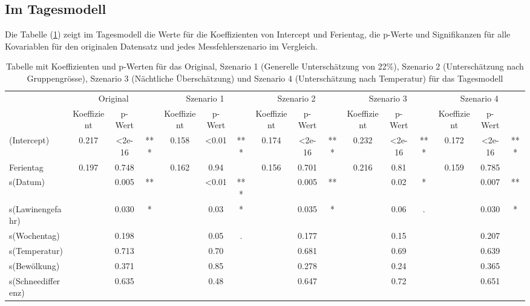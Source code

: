 \documentclass[12pt]{scrreprt}
\begin{document}
\subsection{Im Tagesmodell}
Die Tabelle (\ref{tab:Szenarien im Tagesmodell}) zeigt im Tagesmodell die Werte für die Koeffizienten von Intercept und Ferientag, die p-Werte und Signifikanzen für alle Kovariablen für den originalen Datensatz und jedes Messfehlerszenario im Vergleich. \\
\begin{table}[h]
	\centering
	\begin{adjustbox}{max width=\textwidth}
	\begin{tabular}{l|ccc|ccc|ccc|ccc|ccc|}
		\multicolumn{1}{r}{} & 
		\multicolumn{3}{c}{Original} & 
		\multicolumn{3}{c}{Szenario 1} & 
		\multicolumn{3}{c}{Szenario 2} & 
		\multicolumn{3}{c}{Szenario 3} & 
		\multicolumn{3}{c}{Szenario 4} \\
		& Koeffizient & p-Wert &       & Koeffizient & p-Wert &       & Koeffizient & p-Wert &       & Koeffizient & p-Wert &       & Koeffizient & p-Wert &  \\
		\cmidrule{2-16}    (Intercept) & 0.217 & <2e-16 & ***   & 0.158 & <0.01 & ***   & 0.174 & <2e-16 & ***   & 0.232 & <2e-16 & ***   & 0.172 & <2e-16 & *** \\
		Ferientag & 0.197 & 0.748 &       & 0.162 & 0.94  &       & 0.156 & 0.701 &       & 0.216 & 0.81  &       & 0.159 & 0.785 &   \\
		s(Datum) &       & 0.005 & **    &       & <0.01 & ***   &       & 0.005 & **    &       & 0.02  & *     &       & 0.007 & ** \\
		s(Lawinengefahr) &       & 0.030 & *     &       & 0.03  & *     &       & 0.035 & *     &       & 0.06  & .     &       & 0.030 & * \\
		s(Wochentag) &       & 0.198 &       &       & 0.05  & .     &       & 0.177 &       &       & 0.15  &       &       & 0.207 &   \\
		s(Temperatur) &       & 0.713 &       &       & 0.70  &       &       & 0.681 &       &       & 0.69  &       &       & 0.639 &   \\
		s(Bewölkung) &       & 0.371 &       &       & 0.85  &       &       & 0.278 &       &       & 0.24  &       &       & 0.365 &   \\
		s(Schneedifferenz) &       & 0.635 &       &       & 0.48  &       &       & 0.647 &       &       & 0.72  &       &       & 0.651 &   \\
		\cmidrule{2-16}    \end{tabular}%
	\end{adjustbox}
	\caption{Tabelle mit Koeffizienten und p-Werten für das Original, Szenario 1 (Generelle Unterschätzung von 22\%), Szenario 2 (Unterschätzung nach Gruppengrösse), Szenario 3 (Nächtliche Überschätzung) und Szenario 4 (Unterschätzung nach Temperatur) für das Tagesmodell}
	\label{tab:Szenarien im Tagesmodell}%
\end{table}\\
\end{document}
